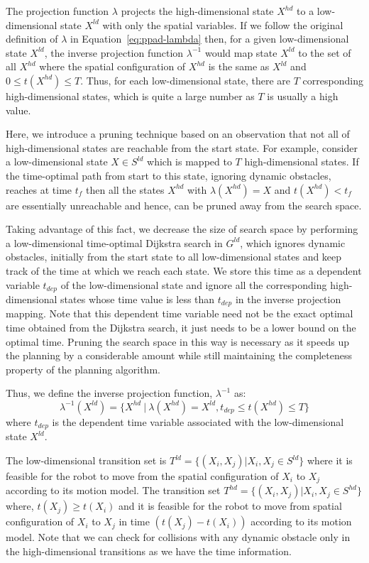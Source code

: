The projection function $\lambda$ projects the high-dimensional state $X^{hd}$ to a low-dimensional state $X^{ld}$ with only the spatial variables. 
If we follow the original definition of $\lambda$ in Equation~\ref{eq:ppad-lambda} then, for a given low-dimensional state $X^{ld}$, the inverse projection function $\lambda^{-1}$ would map state $X^{ld}$ to the set of all $X^{hd}$ where the spatial configuration of $X^{hd}$ is the same as $X^{ld}$ and $0 \leq t(X^{hd}) \leq T$. 
Thus, for each low-dimensional state, there are $T$ corresponding high-dimensional states, which is quite a large number as $T$ is usually a high value. 

Here, we introduce a pruning technique based on an observation that not all of high-dimensional states are reachable from the start state. For example, consider a low-dimensional state $X \in S^{ld}$ which is mapped to $T$ high-dimensional states. If the time-optimal path from start to this state, ignoring dynamic obstacles, reaches at time $t_f$ then all the states $X^{hd}$ with $\lambda(X^{hd}) = X$ and $t(X^{hd}) < t_f$ are essentially unreachable and hence, can be pruned away from the search space. 

Taking advantage of this fact, we decrease the size of search space by performing a low-dimensional time-optimal Dijkstra search in $G^{ld}$, which ignores dynamic obstacles, initially from the start state to all low-dimensional states and keep track of the time at which we reach each state. 
We store this time as a dependent variable $t_{dep}$ of the low-dimensional state and ignore all the corresponding high-dimensional states whose time value is less than $t_{dep}$ in the inverse projection mapping. 
Note that this dependent time variable need not be the exact optimal time obtained from the Dijkstra search, it just needs to be a lower bound on the optimal time. Pruning the search space in this way is necessary as it speeds up the planning by a considerable amount while still maintaining the completeness property of the planning algorithm. 


Thus, we define the inverse projection function, $\lambda^{-1}$ as:
$$\lambda^{-1}(X^{ld}) = \{X^{hd} ~|~ \lambda(X^{hd}) = X^{ld}, t_{dep} \leq t(X^{hd}) \leq T\}$$
where $t_{dep}$ is the dependent time variable associated with the low-dimensional state $X^{ld}$.

The low-dimensional transition set is $T^{ld}=\{(X_i,X_j)|X_i,X_j \in S^{ld}\}$ where it is feasible for the robot to move from the spatial configuration of $X_i$ to $X_j$ according to its motion model. %
The transition set $T^{hd} = \{(X_i, X_j)|X_i, X_j \in S^{hd}\}$ where, $t(X_j) \geq t(X_i)$ and it is feasible for the robot to move from spatial configuration of $X_i$ to $X_j$ in time $(t(X_j) - t(X_i))$ according to its motion model. %
Note that we can check for collisions with any dynamic obstacle only in the high-dimensional transitions as we have the time information.  



